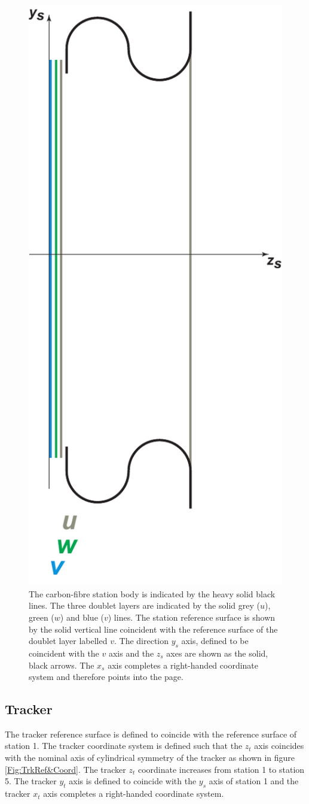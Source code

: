 \begin{figure}
  \begin{center}
    \includegraphics[width=0.22\linewidth]{detectors/tracker/03-Reference-surfaces-and-coordinate-systems/Figures/station.pdf}
  \end{center}
  \caption{ The carbon-fibre station body is indicated by the heavy solid black lines. The three doublet layers are indicated by the solid grey ($u$), green ($w$) and blue ($v$) lines. The station reference surface is shown by the solid vertical line coincident with the reference surface of the doublet layer labelled $v$. The direction $y_s$ axis, defined to be coincident with the $v$ axis and the $z_s$ axes are shown as the solid, black arrows. The $x_s$ axis completes a right-handed coordinate system and therefore points into the page. }
  \label{Fig:StnRef&Coord}
\end{figure}

\subsection{Tracker}
\label{SubSect:TrkrCoordStn}

The tracker reference surface is defined to coincide with the reference surface of station 1. The tracker coordinate system is defined such that the $z_t$ axis coincides with the nominal axis of cylindrical symmetry of the tracker as shown in figure \ref{Fig:TrkRef&Coord}. The tracker $z_t$ coordinate increases from station 1 to station 5. The tracker $y_t$ axis is defined to coincide with the $y_s$ axis of station 1 and the tracker $x_t$ axis completes a right-handed coordinate system.

